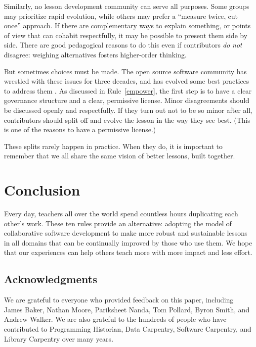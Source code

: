 \documentclass[10pt,letterpaper]{article}
\newcommand{\ruleref}[1]{Rule~\ref{#1}}
\begin{document}
Similarly,
no lesson development community can serve all purposes.
Some groups may prioritize rapid evolution,
while others may prefer a ``measure twice, cut once'' approach.
If there are complementary ways to explain something,
or points of view that can cohabit respectfully,
it may be possible to present them side by side.
There are good pedagogical reasons to do this
even if contributors \emph{do not} disagree:
weighing alternatives fosters higher-order thinking.

But sometimes choices must be made.
The open source software community has wrestled with these issues for three decades,
and has evolved some best practices to address them
\cite{producing-oss}.
As discussed in \ruleref{empower},
the first step is to have a clear governance structure and a clear, permissive license.
Minor disagreements should be discussed openly and respectfully.
If they turn out not to be so minor after all,
contributors should split off and evolve the lesson in the way they see best.
(This is one of the reasons to have a permissive license.)

These splits rarely happen in practice.
When they do,
it is important to remember that we all share the same vision of better lessons, built together.

\section*{Conclusion}

Every day,
teachers all over the world spend countless hours duplicating each other's work.
These ten rules provide an alternative:
adopting the model of collaborative software development
to make more robust and sustainable lessons in all domains
that can be continually improved by those who use them.
We hope that our experiences can help others teach more
with more impact and less effort.

\subsection*{Acknowledgments}

We are grateful to everyone who provided feedback on this paper,
including
James Baker,
Nathan Moore,
Pariksheet Nanda,
Tom Pollard,
Byron Smith,
and Andrew Walker.
We are also grateful to the hundreds of people who have contributed to
Programming Historian, Data Carpentry, Software Carpentry, and Library Carpentry
over many years.

\nolinenumbers
\end{document}
